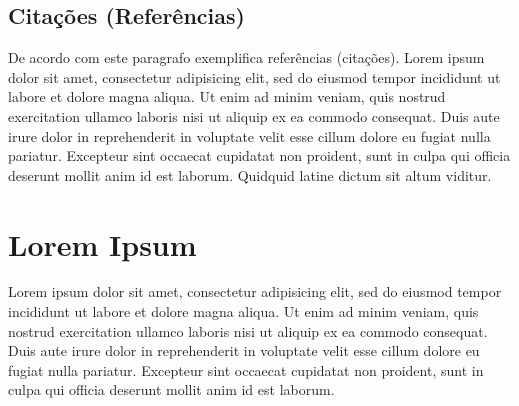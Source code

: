 \subsection{Citações (Referências)}

De acordo com \cite{DEAD:1666,BEEF:1234} este paragrafo exemplifica referências
(citações). Lorem ipsum dolor sit amet, consectetur adipisicing elit, sed do
eiusmod tempor incididunt ut labore et dolore magna aliqua. Ut enim ad minim
veniam, quis nostrud exercitation ullamco laboris nisi ut aliquip ex ea commodo
consequat. Duis aute irure dolor in reprehenderit in voluptate velit esse
cillum dolore eu fugiat nulla pariatur. Excepteur sint occaecat cupidatat non
proident, sunt in culpa qui officia deserunt mollit anim id est laborum.
Quidquid latine dictum sit altum viditur.


\section{Lorem Ipsum}

Lorem ipsum dolor sit amet, consectetur adipisicing elit, sed do eiusmod tempor
incididunt ut labore et dolore magna aliqua. Ut enim ad minim veniam, quis
nostrud exercitation ullamco laboris nisi ut aliquip ex ea commodo consequat.
Duis aute irure dolor in reprehenderit in voluptate velit esse cillum dolore eu
fugiat nulla pariatur. Excepteur sint occaecat cupidatat non proident, sunt in
culpa qui officia deserunt mollit anim id est laborum.

